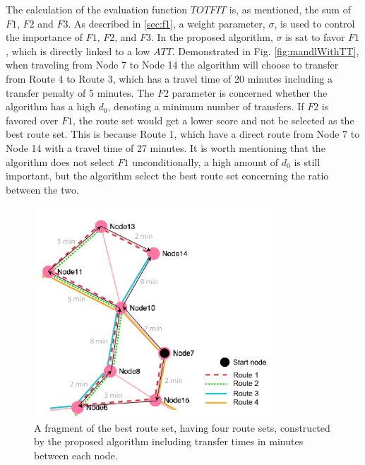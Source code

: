 The calculation of the evaluation function $TOTFIT$ is, as mentioned, the sum of $F1$, $F2$ and $F3$. As described in \vref{sec:f1}, a weight parameter, $\sigma$, is used to control the importance of $F1$, $F2$, and $F3$. In the proposed algorithm, $\sigma$ is sat to favor $F1$, which is directly linked to a low $ATT$. Demonstrated in Fig. \vref{fig:mandlWithTT}, when traveling from Node 7 to Node 14 the algorithm will choose to transfer from Route 4 to Route 3, which has a travel time of 20 minutes including a transfer penalty of 5 minutes. The $F2$ parameter is concerned whether the algorithm has a high $d_0$, denoting a minimum number of transfers. If $F2$ is favored over $F1$, the route set would get a lower score and not be selected as the best route set. This is because Route 1, which have a direct route from Node 7 to Node 14 with a travel time of 27 minutes. It is worth mentioning that the algorithm does not select $F1$ unconditionally, a high amount of $d_0$ is still important, but the algorithm select the best route set concerning the ratio between the two. 

\begin{figure}[H]
    \begin{center}
    \includegraphics[width=3.5in]{assets/mandl_withTT_utsnitt.png}
    \end{center}
    \caption{A fragment of the best route set, having four route sets, constructed by the proposed algorithm including transfer times in minutes between each node.}
    \label{fig:mandlWithTT} 
\end{figure}


